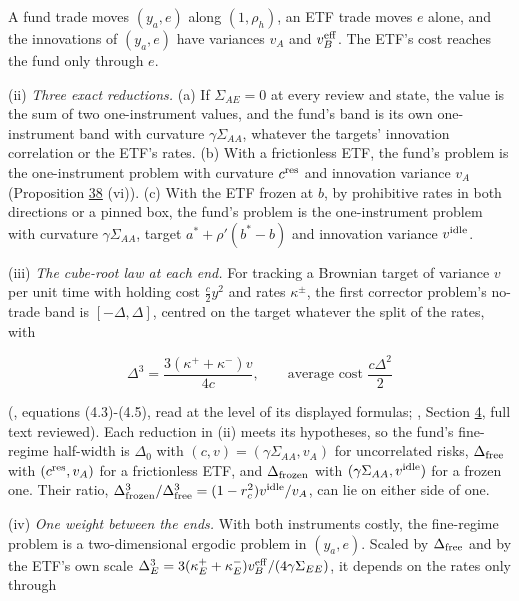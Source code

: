 \documentclass[11pt]{article}
\begin{document}
A fund trade moves \((y_a,e)\) along \((1,\rho_h)\), an ETF trade moves \(e\) alone,
and the innovations of \((y_a,e)\) have variances \(v_A\) and \(v_B^{\rm eff}\). The
ETF's cost reaches the fund only through \(e\).

(ii) \emph{Three exact reductions.} (a) If \(\Sigma_{AE}=0\) at every review and
state, the value is the sum of two one-instrument values, and the fund's
band is its own one-instrument band with curvature \(\gamma\Sigma_{AA}\), whatever
the targets' innovation correlation or the ETF's rates. (b) With a
frictionless ETF, the fund's problem is the one-instrument problem
with curvature \(c^{\rm res}\) and innovation variance \(v_A\) (Proposition \hyperref[res:Proposition-38]{38} (vi)).
(c) With the ETF frozen at \(b\), by prohibitive rates in both directions
or a pinned box, the fund's problem is the one-instrument problem with
curvature \(\gamma\Sigma_{AA}\), target \(a^*+\rho'(b^*-b)\) and innovation variance \(v^{\rm idle}\).

(iii) \emph{The cube-root law at each end.} For tracking a Brownian target of
variance \(v\) per unit time with holding cost \(\frac c2y^2\) and rates \(\kappa^\pm\), the
first corrector problem's no-trade band is \([-\Delta,\Delta]\), centred on the
target whatever the split of the rates, with

\begin{equation*}
\Delta^3=\frac{3(\kappa^++\kappa^-)v}{4c},\qquad\text{average cost }\frac{c\Delta^2}2\tag{139}\label{eq:139}
\end{equation*}

(\cite{soner2013homogenization}, equations (4.3)-(4.5), read at the level of
its displayed formulas; \cite{muhlekarbe2017primer}, Section \hyperref[sec:4]{4}, full text
reviewed). Each reduction in (ii) meets its hypotheses, so the fund's
fine-regime half-width is \(\Delta_0\) with \((c,v)=(\gamma\Sigma_{AA},v_A)\) for
uncorrelated risks, \(\Delta_{\rm free}\) with \((c^{\rm res},v_A)\) for a frictionless ETF, and
\(\Delta_{\rm frozen}\) with \((\gamma\Sigma_{AA},v^{\rm idle})\) for a frozen one. Their ratio,
\(\Delta_{\rm frozen}^3/\Delta_{\rm free}^3=(1-r_c^2)v^{\rm idle}/v_A\), can lie on either side of one.

(iv) \emph{One weight between the ends.} With both instruments costly, the
fine-regime problem is a two-dimensional ergodic problem in \((y_a,e)\).
Scaled by \(\Delta_{\rm free}\) and by the ETF's own scale
\(\Delta_E^3=3(\kappa^+_E+\kappa^-_E)v_B^{\rm eff}/(4\gamma\Sigma_{EE})\), it depends on the rates only
through
\end{document}
